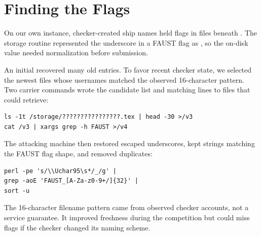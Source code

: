 \section{Finding the Flags}
\label{sec:flag-harvesting}

On our own instance, checker-created ship names held flags in files beneath
. The storage routine represented the underscore in a FAUST
flag as , so the on-disk value needed
normalization before submission.

An initial  recovered many old entries. To
favor recent checker state, we selected the newest files whose usernames
matched the observed 16-character pattern. Two carrier commands wrote the
candidate list and matching lines to files that  could retrieve:

\begin{lstlisting}
ls -1t /storage/????????????????.tex | head -30 >/v3
cat /v3 | xargs grep -h FAUST >/v4
\end{lstlisting}

The attacking machine then restored escaped underscores, kept strings
matching the FAUST flag shape, and removed duplicates:

\begin{lstlisting}
perl -pe 's/\\Uchar95\s*/_/g' |
grep -aoE 'FAUST_[A-Za-z0-9+/]{32}' |
sort -u
\end{lstlisting}

The 16-character filename pattern came from observed checker accounts,
not a service guarantee. It improved freshness during the competition
but could miss flags if the checker changed its naming scheme.
